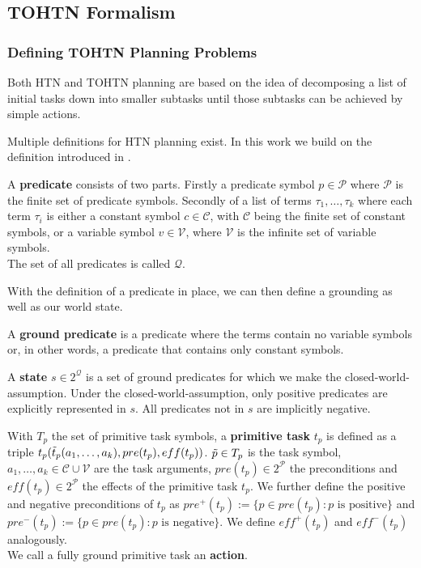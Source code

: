 \subsection{TOHTN Formalism}

\subsubsection{Defining TOHTN Planning Problems}
Both HTN and TOHTN planning are based on the idea of decomposing a list of initial tasks down into smaller subtasks until those subtasks can be achieved by simple actions.

Multiple definitions for HTN planning exist. In this work we build on the definition introduced in \cite{georgievski2015htn}.

\begin{definition} %
	A \textbf{predicate} consists of two parts. Firstly a predicate symbol $p \in \mathcal{P}$ where $\mathcal{P}$ is the finite set of predicate symbols. Secondly of a list of terms $\tau_1, \ldots, \tau_k$ where each term $\tau_i$ is either a constant symbol $c \in \mathcal{C}$, with $\mathcal{C}$ being the finite set of constant symbols, or a variable symbol $v \in \mathcal{V}$, where $\mathcal{V}$ is the infinite set of variable symbols. \\
	The set of all predicates is called $\mathcal{Q}$.
\end{definition}
With the definition of a predicate in place, we can then define a grounding as well as our world state.
\begin{definition} %
	A \textbf{ground predicate} is a predicate where the terms contain no variable symbols or, in other words, a predicate that contains only constant symbols.
\end{definition}
\begin{definition} %
	A \textbf{state} $s \in 2^{\mathcal{Q}}$ is a set of ground predicates for which we make the closed-world-assumption. Under the closed-world-assumption, only positive predicates are explicitly represented in $s$. All predicates not in $s$ are implicitly negative.
\end{definition}


\begin{definition} %
	With $T_p$ the set of primitive task symbols, a \textbf{primitive task} $t_p$ is defined as a triple $t_p(\Tilde{t}_p (a_1, \ldots, a_k), pre(t_p), eff(t_p))$. $\Tilde{p} \in T_p$ is the task symbol, $a_1, \ldots, a_k \in \mathcal{C} \cup \mathcal{V}$ are the task arguments, $pre(t_p) \in 2^{\mathcal{P}}$ the preconditions and $eff(t_p) \in 2^{\mathcal{P}}$ the effects of the primitive task $t_p$. We further define the positive and negative preconditions of $t_p$ as $pre^+(t_p) := \{p \in pre(t_p) : p \text{ is positive}\}$ and $pre^-(t_p) := \{p \in pre(t_p) : p \text{ is negative}\}$. We define $eff^+(t_p)$ and $eff^-(t_p)$ analogously. \\
	We call a fully ground primitive task an \textbf{action}.
\end{definition}

